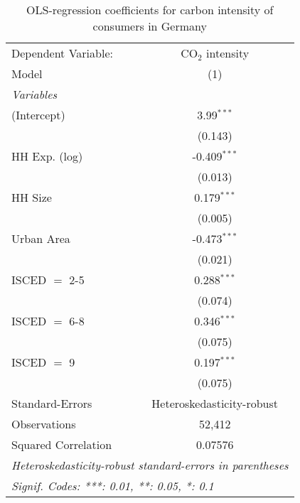 
\begin{table}[htbp!]
   \centering
   \small
   \begin{adjustbox}{width = 1\textwidth, max height = 0.95\textheight, center}
      \begin{threeparttable}[b]
         \caption{\label{tab:OLS_1_DEU} OLS-regression coefficients for carbon intensity of consumers in Germany}
         \begin{tabular}{lc}
            \tabularnewline \midrule \midrule
            Dependent Variable: & CO$_{2}$ intensity\\  
            Model               & (1)\\  
            \midrule
            \emph{Variables}\\
            (Intercept)         & 3.99$^{***}$\\   
                                & (0.143)\\   
            HH Exp. (log)       & -0.409$^{***}$\\   
                                & (0.013)\\   
            HH Size             & 0.179$^{***}$\\   
                                & (0.005)\\   
            Urban Area          & -0.473$^{***}$\\   
                                & (0.021)\\   
            ISCED $=$ 2-5       & 0.288$^{***}$\\   
                                & (0.074)\\   
            ISCED $=$ 6-8       & 0.346$^{***}$\\   
                                & (0.075)\\   
            ISCED $=$ 9         & 0.197$^{***}$\\   
                                & (0.075)\\   
            \midrule 
            Standard-Errors     & Heteroskedasticity-robust \\   
            Observations        & 52,412\\  
            Squared Correlation & 0.07576\\  
            \midrule \midrule
            \multicolumn{2}{l}{\emph{Heteroskedasticity-robust standard-errors in parentheses}}\\
            \multicolumn{2}{l}{\emph{Signif. Codes: ***: 0.01, **: 0.05, *: 0.1}}\\
         \end{tabular}
         

\end{threeparttable}
\end{adjustbox}
\end{table}
